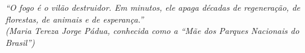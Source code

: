 
\begin{epigrafe}
\vspace*{\fill}

\noindent\hfill
\begin{minipage}{0.65\textwidth}
\raggedleft
\textit{“O fogo é o vilão destruidor. Em minutos, ele apaga décadas de regeneração, de florestas, de animais e de esperança.”}\\[0.5\baselineskip]
\textit{(Maria Tereza Jorge Pádua, conhecida como a ``Mãe dos Parques Nacionais do Brasil'')}
\end{minipage}

\vspace*{1.5cm}
\end{epigrafe}